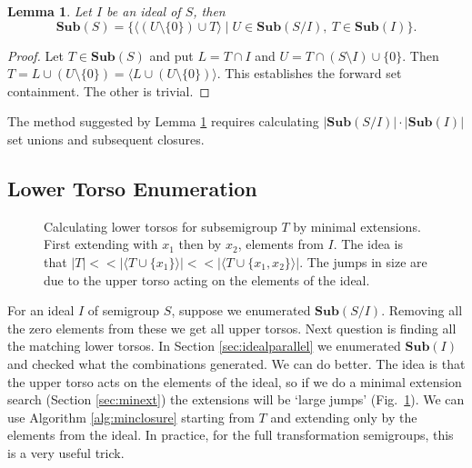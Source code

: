 \documentclass{amsart}
\newcommand{\Sub}{\mathbf{Sub}}
\theoremstyle{plain}
\newtheorem{lemma}[theorem]{Lemma}
\theoremstyle{definition}
\begin{document}
\begin{lemma}
\label{lem:torso}
Let $I$ be an ideal of $S$, then $$\Sub(S)=\big\{\langle (U\setminus\{0\})\cup T \rangle\mid U\in \Sub(S/I),\ T\in\Sub(I)\big\}.$$
\end{lemma}
\begin{proof}
Let $T\in\Sub(S)$ and put $L=T\cap I$ and $U=T\cap(S\setminus I)\cup\{0\}$. Then $T=L\cup(U\setminus \{0\})=\langle L\cup(U\setminus\{0\})\rangle$. This establishes the forward set containment. The other is trivial.
\end{proof}



The method suggested by Lemma \ref{lem:torso} requires calculating $|\Sub(S/I)|\cdot|\Sub(I)|$ set unions and subsequent closures. 
\subsection{Lower Torso Enumeration}
\label{sec:lowertorso}
\begin{figure}

\caption{Calculating lower torsos for subsemigroup $T$ by minimal extensions. First extending with $x_1$ then by $x_2$, elements from $I$. The idea is that $|T| << |\langle T\cup\{x_1\}\rangle| << |\langle T\cup\{x_1,x_2\}\rangle|$. The jumps in size are due to the upper torso acting on the elements of the ideal.}
\label{fig:lowertorsoenum}
\end{figure}
For an ideal $I$ of semigroup $S$, suppose we enumerated $\Sub(S/I)$.
Removing all the zero elements from these we get all upper torsos.
Next question is finding all the matching lower torsos.
In Section \ref{sec:idealparallel} we enumerated $\Sub(I)$ and checked what the combinations generated.
We can do better.
The idea is that the upper torso acts on the elements of the ideal, so if we do a minimal extension search (Section \ref{sec:minext}) the extensions will be `large jumps' (Fig.~\ref{fig:lowertorsoenum}).
We can use Algorithm \ref{alg:minclosure} starting from $T$ and extending only by the elements from the ideal. %
In practice, for the full transformation semigroups, this is a very useful trick.
\end{document}
